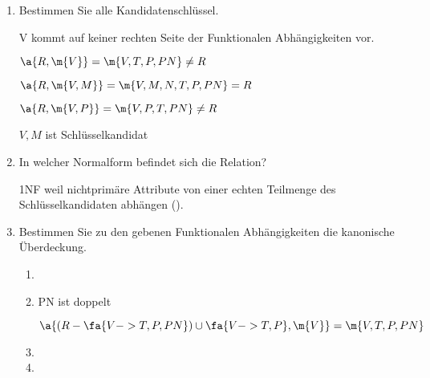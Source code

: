 \documentclass{lehramt-informatik-aufgabe}
\begin{document}
\begin{enumerate}

%

\item Bestimmen Sie alle Kandidatenschlüssel.

\begin{liAntwort}
V kommt auf keiner rechten Seite der Funktionalen Abhängigkeiten vor.

$\a{R, \m{V}} = \m{V, T, P, PN} \neq  R$

$\a{R, \m{V, M}} = \m{V, M, N, T, P, PN} = R$

$\a{R, \m{V, P}} = \m{V, P, T, PN} \neq R$

$V, M$ ist Schlüsselkandidat
\end{liAntwort}

%

\item In welcher Normalform befindet sich die Relation?

\begin{liAntwort}
1NF weil nichtprimäre Attribute von einer echten Teilmenge des
Schlüsselkandidaten abhängen (\zB {}).
\end{liAntwort}

%

\item Bestimmen Sie zu den gebenen Funktionalen Abhängigkeiten die
kanonische Überdeckung.

\begin{liAntwort}

\begin{enumerate}
\item {}

\liNichtsZuTun

\item {}

PN ist doppelt

$\a{(R - \fa{V -> T, P, PN}) \cup \fa{V -> T, P}, \m{V}} = \m{V, T, P, PN}$


\item {}

\liNichtsZuTun

\item {}


\end{enumerate}
\end{liAntwort}


\end{enumerate}
\end{document}
